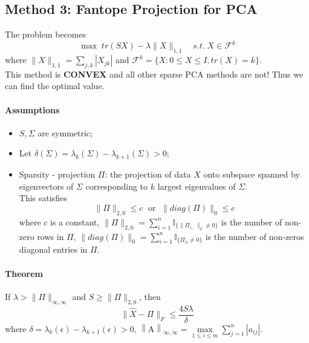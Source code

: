 \documentclass[12pt]{book}
\theoremstyle{definition}
\theoremstyle{remark}
\begin{document}
\subsection{Method 3: Fantope Projection for PCA}
The problem becomes
\[\max\; tr(SX) - \lambda\|X\|_{1,1}\quad s.t. \; X\in \mathcal{F}^k\]
where $\|X\|_{1,1} = \sum_{j,k}|X_{jk}| $ and $\mathcal{F}^k  = \{X: 0\le X\le I, tr(X) = k\}$.\\

This method is \textbf{CONVEX} and all other sparse PCA methods are not!
Thus we can find the optimal value.

\paragraph{Assumptions}
\begin{itemize}
    \item $S, \Sigma$ are symmetric;
    \item Let $\delta(\Sigma) = \lambda_k(\Sigma) - \lambda_{k+1}(\Sigma)>0$;
    \item Sparsity - projection $\Pi$: the projection of data $X$ onto subspace spanned by eigenvectors of $\Sigma$ corresponding to $k$ largest eigenvalues of $\Sigma$.\\
    This satisfies \[\|\Pi\|_{2,0}\le c \;\text{ or } \;\|diag(\Pi)\|_0\le c\] where $c$ is a constant, $\|\Pi\|_{2,0} = \sum_{i=1}^n \mathbb{I}_{\{\|\Pi_{i,:}\|_2 \neq 0\}}$ is the number of non-zero rows in $\Pi$, $ \|diag(\Pi)\|_0 = \sum_{i=1}^n \mathbb{I}_{\{\Pi_{ii} \neq 0\}}$ is the number of non-zeros diagonal entries in $\Pi$.
\end{itemize}

\paragraph{Theorem} If $\lambda > \|\Pi\|_{\infty, \infty}$ and $S \ge \|\Pi\|_{2,0}$, then 
\[\|\hat{X} - \Pi\|_F \le \frac{4S\lambda}{\delta}\]
where $\delta = \lambda_k(\epsilon) - \lambda_{k+1}(\epsilon)>0$, $\left \| \mathrm {A}    \right \| _{\infty, \infty}=\underset{1\le i\le m}{\max} \sum_{j=1}^{n}\left | a_{ij} \right |$.\\
\end{document}
